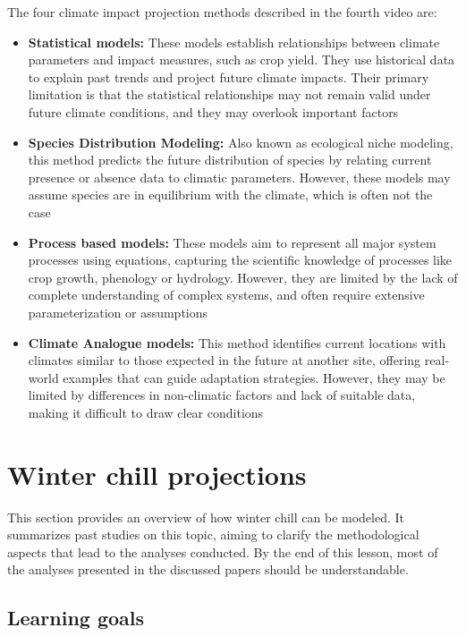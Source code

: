 \documentclass[
]{article}
\begin{document}
The four climate impact projection methods described in the fourth video are:

\begin{itemize}
\item
  \textbf{Statistical models:} These models establish relationships between climate parameters and impact measures, such as crop yield. They use historical data to explain past trends and project future climate impacts. Their primary limitation is that the statistical relationships may not remain valid under future climate conditions, and they may overlook important factors
\item
  \textbf{Species Distribution Modeling:} Also known as ecological niche modeling, this method predicts the future distribution of species by relating current presence or absence data to climatic parameters. However, these models may assume species are in equilibrium with the climate, which is often not the case
\item
  \textbf{Process based models:} These models aim to represent all major system processes using equations, capturing the scientific knowledge of processes like crop growth, phenology or hydrology. However, they are limited by the lack of complete understanding of complex systems, and often require extensive parameterization or assumptions
\item
  \textbf{Climate Analogue models:} This method identifies current locations with climates similar to those expected in the future at another site, offering real-world examples that can guide adaptation strategies. However, they may be limited by differences in non-climatic factors and lack of suitable data, making it difficult to draw clear conditions
\end{itemize}

\section{Winter chill projections}\label{winter-chill-projections}

This section provides an overview of how winter chill can be modeled. It summarizes past studies on this topic, aiming to clarify the methodological aspects that lead to the analyses conducted. By the end of this lesson, most of the analyses presented in the discussed papers should be understandable.

\subsection{Learning goals}\label{learning-goals-2}
\end{document}

